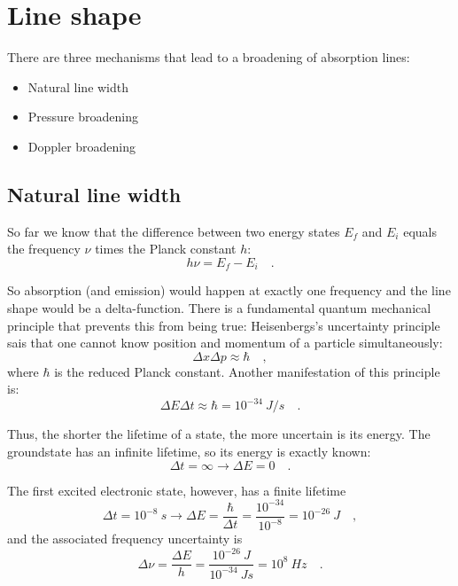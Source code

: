 \section{Line shape}
\label{sec:line_shape}

There are three mechanisms that lead to a broadening of absorption lines:
\begin{itemize}
\item Natural line width
\item Pressure broadening
\item Doppler broadening 
\end{itemize}

\subsection{Natural line width}

So far we know that the difference between two energy states $E_{f}$
and $E_{i}$ equals the frequency $\nu$ times the Planck constant $h$:
\begin{equation}
h \nu = E_f - E_i \quad .
\end{equation}

So absorption (and emission) would happen at exactly one frequency and
the line shape would be a delta-function. There is a fundamental
quantum mechanical principle that prevents this from being true:
Heisenbergs's uncertainty principle sais that one cannot know position
and momentum of a particle simultaneously:
\begin{equation}
\Delta x \Delta p \approx \hbar \quad ,
\end{equation}
where $\hbar$ is the reduced Planck constant. Another manifestation of this principle is:
\begin{equation}
\Delta E \Delta t \approx \hbar = 10^{-34}~J/s \quad .
\end{equation}

Thus, the shorter the lifetime of a state, the more uncertain is its energy. 
The groundstate has an infinite lifetime, so its energy is exactly known:
\begin{equation}
\Delta t = \infty \rightarrow \Delta E = 0 \quad .
\end{equation}

The first excited electronic state, however, has a finite lifetime
\begin{equation}
\Delta t = 10^{-8}~s \rightarrow \Delta E = \frac{\hbar}{\Delta t} =
\frac{10^{-34}}{10^{-8}} = 10^{-26}~J \quad ,
\end{equation}
and the associated frequency uncertainty is
\begin{equation}
\Delta \nu = \frac{\Delta E}{h} = \frac{10^{-26}~J}{10^{-34}~Js} =
10^{8}~Hz \quad .
\end{equation}

